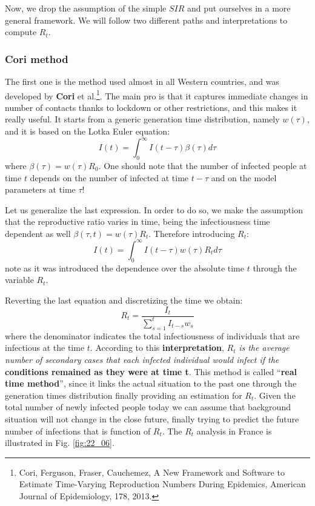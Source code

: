 \documentclass[../main/main.tex]{subfiles}
\begin{document}
Now, we drop the assumption of the simple $SIR$ and put ourselves in a more general framework. We will follow two different paths and interpretations to compute $R_t$.


\subsubsection{Cori method}

The first one is the method used almost in all Western countries, and was developed by \textbf{Cori} et al.\footnote{Cori, Ferguson, Fraser, Cauchemez, A New Framework and Software to Estimate Time-Varying Reproduction Numbers During Epidemics, American Journal of Epidemiology, 178, 2013.}.
The main pro is that it captures immediate changes in number of contacts thanks to lockdown or other restrictions, and this makes it really useful. It starts from a generic generation time distribution, namely $w(\tau)$, and it is based on the Lotka Euler equation:
\begin{equation}
    I(t) = \int_0^\infty I(t-\tau) \beta(\tau) d \tau
\end{equation}
where $\beta(\tau) = w(\tau)R_0$. One should note that the number of infected people at time $t$ depends on the number of infected at time $t-\tau$ and on the model parameters at time $\tau$!

Let us generalize the last expression. In order to do so, we make the assumption that the reproductive ratio varies in time, being the infectiousness time dependent as well $\beta (\tau,t) = w(\tau)R_t$. Therefore introducing $R_t$:
\begin{equation}
    I(t) = \int_0^\infty I(t-\tau) w(\tau) R_t d\tau
\end{equation}
note as it was introduced the dependence over the absolute time $t$ through the variable $R_t$.

Reverting the last equation and discretizing the time we obtain:
\begin{equation}
    R_t = \frac{I_t}{\sum_{s=1}^t I_{t-s}w_s}
\end{equation}
where the denominator indicates the total infectiousness of individuals that are infectious at the time $t$.
According to this \textbf{interpretation}, $R_t$ \emph{is the average number of secondary cases that each infected individual would infect if the} \textbf{conditions remained as they were at time t}.
This method is called “\textbf{real time method}”, since it links the actual situation to the past one through the generation times distribution finally providing an estimation for $R_t$. Given the total number of newly infected people today we can assume that background situation will not change in the close future, finally trying to predict the future number of infections that is function of $R_t$.
The \( R_t \) analysis in France is illustrated in Fig. \ref{fig:22_06}.
\end{document}
